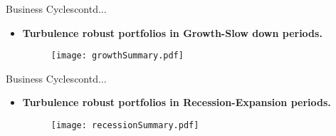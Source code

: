 \documentclass{beamer}
\begin{document}
\begin{frame}{Business Cycles}{contd...}
		\vspace*{-0 in}
		\begin{itemize}
		\item{\textbf{Turbulence robust portfolios in Growth-Slow down periods.}}
		\vspace*{-0.71in}
		\begin{figure}
			\scalebox{0.72}
			{\hspace*{-0.6in}\texttt{[image: growthSummary.pdf]}}
		\end{figure}
		\vspace*{-0.4 in}
	\end{itemize}
\end{frame}

\begin{frame}{Business Cycles}{contd...}
		\vspace*{-0 in}
		\begin{itemize}
		\item{\textbf{Turbulence robust portfolios in Recession-Expansion periods.}}
		\vspace*{-0.71in}
		\begin{figure}
			\scalebox{0.72}
			{\hspace*{-0.6in}\texttt{[image: recessionSummary.pdf]}}
		\end{figure}
		\vspace*{-0.4 in}
	\end{itemize}
\end{frame}
\end{document}
